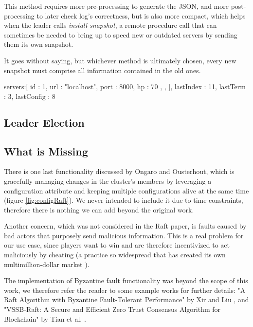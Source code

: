 This method requires more pre-processing to generate the JSON, and more post-processing to later check log's correctness, but is also more compact, which helps when the leader calls \textit{install snapshot}, a remote procedure call that can sometimes be needed to bring up to speed new or outdated servers by sending them its own snapshot. 

It goes without saying, but whichever method is ultimately chosen, every new snapshot must comprise all information contained in the old ones.

\begin{python}[label={code:snapJson}, caption={The JSON for a snapshot of the whole server would look something like this}]
{
    servers:[
        {
            id : 1,
            url : "localhost",
            port : 8000,
            hp : 70
        },
        {}, {}
    ],
    lastIndex : 11,
    lastTerm : 3,
    lastConfig : 8
}
\end{python}

\subsection{Leader Election}

\subsection{What is Missing} \label{sec:raftMissing}

There is one last functionality discussed by Ongaro and Ousterhout, which is gracefully managing changes in the cluster's members by leveraging a configuration attribute and keeping multiple configurations alive at the same time (figure \ref{fig:configRaft}). We never intended to include it due to time constraints, therefore there is nothing we can add beyond the original work. 

Another concern, which was not considered in the Raft paper, is faults caused by bad actors that purposely send malicious information. This is a real problem for our use case, since players want to win and are therefore incentivized to act maliciously by cheating (a practice so widespread that has created its own multimillion-dollar market \cite{wiredCheat}).

The implementation of Byzantine fault functionality was beyond the scope of this work, we therefore refer the reader to some example works for further details: "A Raft Algorithm with Byzantine Fault-Tolerant Performance" by Xir and Liu \cite{liuXie}, and "VSSB-Raft: A Secure and Efficient Zero Trust Consensus Algorithm for Blockchain" by Tian et al. \cite{tianetal}.

